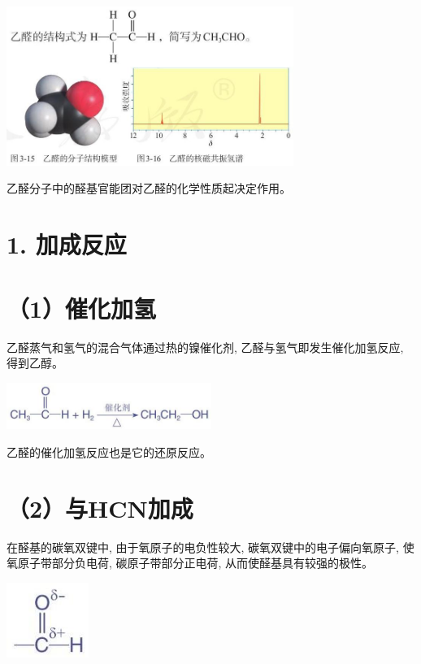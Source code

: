 \documentclass[10pt]{article}
\begin{document}
\begin{center}
\includegraphics[max width=0.7\textwidth]{images/0190efc5-b58a-7c43-bfb0-e0a030df9cfd_73_744448.jpg}
\end{center}

乙醛分子中的醛基官能团对乙醛的化学性质起决定作用。

\section*{1. 加成反应}

\section*{（1）催化加氢}

乙醛蒸气和氢气的混合气体通过热的镍催化剂, 乙醛与氢气即发生催化加氢反应, 得到乙醇。

\begin{center}
\includegraphics[max width=0.5\textwidth]{images/0190efc5-b58a-7c43-bfb0-e0a030df9cfd_74_261387.jpg}
\end{center}

乙醛的催化加氢反应也是它的还原反应。

\section*{（2）与HCN加成}

在醛基的碳氧双键中, 由于氧原子的电负性较大, 碳氧双键中的电子偏向氧原子, 使氧原子带部分负电荷, 碳原子带部分正电荷, 从而使醛基具有较强的极性。

\begin{center}
\includegraphics[max width=0.2\textwidth]{images/0190efc5-b58a-7c43-bfb0-e0a030df9cfd_74_107156.jpg}
\end{center}
\end{document}
